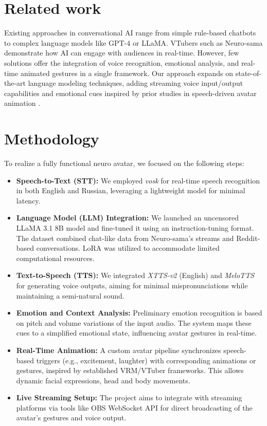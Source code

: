 \documentclass[conference]{IEEEtran}
\begin{document}
\section{Related work}
Existing approaches in conversational AI range from simple rule-based chatbots to complex language models like GPT-4 or LLaMA. VTubers such as Neuro-sama demonstrate how AI can engage with audiences in real-time. However, few solutions offer the integration of voice recognition, emotional analysis, and real-time animated gestures in a single framework. Our approach expands on state-of-the-art language modeling techniques, adding streaming voice input/output capabilities and emotional cues inspired by prior studies in speech-driven avatar animation \cite{VTuberRef}.

\section{Methodology}
To realize a fully functional neuro avatar, we focused on the following steps:
\begin{itemize}
    \item \textbf{Speech-to-Text (STT):} We employed \textit{vosk} for real-time speech recognition in both English and Russian, leveraging a lightweight model for minimal latency.
    \item \textbf{Language Model (LLM) Integration:} We launched an uncensored LLaMA 3.1 8B model and fine-tuned it using an instruction-tuning format. The dataset combined chat-like data from Neuro-sama’s streams and Reddit-based conversations. LoRA was utilized to accommodate limited computational resources.
    \item \textbf{Text-to-Speech (TTS):} We integrated \textit{XTTS-v2} (English) and \textit{MeloTTS} for generating voice outputs, aiming for minimal mispronunciations while maintaining a semi-natural sound.
    \item \textbf{Emotion and Context Analysis:} Preliminary emotion recognition is based on pitch and volume variations of the input audio. The system maps these cues to a simplified emotional state, influencing avatar gestures in real-time.
    \item \textbf{Real-Time Animation:} A custom avatar pipeline synchronizes speech-based triggers (e.g., excitement, laughter) with corresponding animations or gestures, inspired by established VRM/VTuber frameworks. This allows dynamic facial expressions, head and body movements.
    \item \textbf{Live Streaming Setup:} The project aims to integrate with streaming platforms via tools like OBS WebSocket API for direct broadcasting of the avatar’s gestures and voice output.
\end{itemize}
\end{document}
